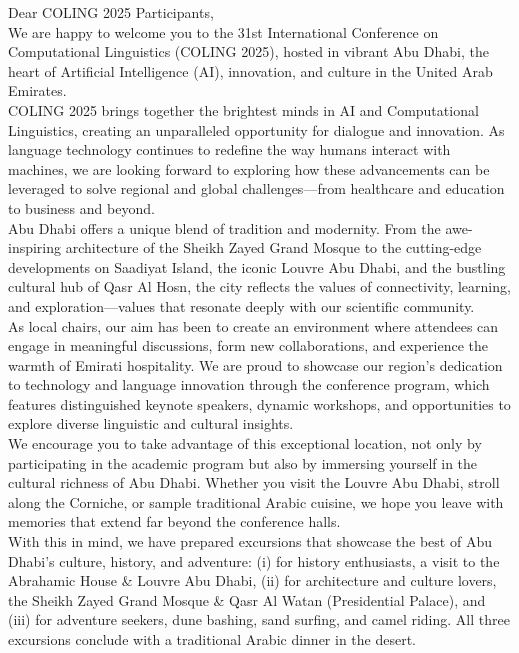 Dear COLING 2025 Participants,\\

We are happy to welcome you to the 31st International Conference on Computational Linguistics (COLING 2025), hosted in vibrant Abu Dhabi, the heart of Artificial Intelligence (AI), innovation, and culture in the United Arab Emirates. \\

COLING 2025 brings together the brightest minds in AI and Computational Linguistics, creating an unparalleled opportunity for dialogue and innovation. As language technology continues to redefine the way humans interact with machines, we are looking forward to exploring how these advancements can be leveraged to solve regional and global challenges—from healthcare and education to business and beyond.\\

Abu Dhabi offers a unique blend of tradition and modernity. From the awe-inspiring architecture of the Sheikh Zayed Grand Mosque to the cutting-edge developments on Saadiyat Island, the iconic Louvre Abu Dhabi, and the bustling cultural hub of Qasr Al Hosn, the city reflects the values of connectivity, learning, and exploration—values that resonate deeply with our scientific community.\\

As local chairs, our aim has been to create an environment where attendees can engage in meaningful discussions, form new collaborations, and experience the warmth of Emirati hospitality. We are proud to showcase our region’s dedication to technology and language innovation through the conference program, which features distinguished keynote speakers, dynamic workshops, and opportunities to explore diverse linguistic and cultural insights.\\

We encourage you to take advantage of this exceptional location, not only by participating in the academic program but also by immersing yourself in the cultural richness of Abu Dhabi. Whether you visit the Louvre Abu Dhabi, stroll along the Corniche, or sample traditional Arabic cuisine, we hope you leave with memories that extend far beyond the conference halls.\\

With this in mind, we have prepared excursions that showcase the best of Abu Dhabi’s culture, history, and adventure: (i) for history enthusiasts, a visit to the Abrahamic House \& Louvre Abu Dhabi, (ii) for architecture and culture lovers, the Sheikh Zayed Grand Mosque \& Qasr Al Watan (Presidential Palace), and (iii) for adventure seekers, dune bashing, sand surfing, and camel riding. All three excursions conclude with a traditional Arabic dinner in the desert.\\


